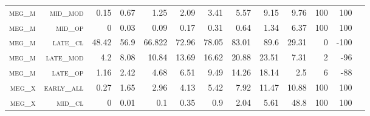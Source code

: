 \begin{landscape}
\begin{table}[!htbp]
\begin{tabular}{@{}rrrrrrrrrr|rrr@{}}
\footnotesize \textsc{meg\_m}      & \footnotesize \textsc{mid\_mod  }                & \footnotesize 0.15          & \footnotesize 0.67           & \footnotesize 1.25             & \footnotesize 2.09            & \footnotesize 3.41            & \footnotesize 5.57            & \footnotesize 9.15       & \footnotesize 9.76     & \footnotesize 100    & \footnotesize 100    \\
\footnotesize \textsc{meg\_m}      & \footnotesize \textsc{mid\_op   }                & \footnotesize 0             & \footnotesize 0.03           & \footnotesize 0.09             & \footnotesize 0.17            & \footnotesize 0.31            & \footnotesize 0.64            & \footnotesize 1.34       & \footnotesize 6.37     & \footnotesize 100    & \footnotesize 100    \\
\footnotesize \textsc{meg\_m}      & \footnotesize \textsc{late\_cl  }                & \footnotesize 48.42         & \footnotesize 56.9           & \footnotesize 66.822           & \footnotesize 72.96           & \footnotesize 78.05           & \footnotesize 83.01           & \footnotesize 89.6       & \footnotesize 29.31    & \footnotesize 0      & \footnotesize -100    \\
\footnotesize \textsc{meg\_m}      & \footnotesize \textsc{late\_mod }                & \footnotesize 4.2           & \footnotesize 8.08           & \footnotesize 10.84            & \footnotesize 13.69           & \footnotesize 16.62           & \footnotesize 20.88           & \footnotesize 23.51      & \footnotesize 7.31     & \footnotesize 2      & \footnotesize -96    \\
\footnotesize \textsc{meg\_m}      & \footnotesize \textsc{late\_op  }                & \footnotesize 1.16          & \footnotesize 2.42           & \footnotesize 4.68             & \footnotesize 6.51            & \footnotesize 9.49            & \footnotesize 14.26           & \footnotesize 18.14      & \footnotesize 2.5      & \footnotesize 6      & \footnotesize -88    \\
\footnotesize \textsc{meg\_x}      & \footnotesize \textsc{early\_all}                & \footnotesize 0.27          & \footnotesize 1.65           & \footnotesize 2.96             & \footnotesize 4.13            & \footnotesize 5.42            & \footnotesize 7.92            & \footnotesize 11.47      & \footnotesize 10.88    & \footnotesize 100    & \footnotesize 100    \\
\footnotesize \textsc{meg\_x}      & \footnotesize \textsc{mid\_cl   }                & \footnotesize 0             & \footnotesize 0.01           & \footnotesize 0.1              & \footnotesize 0.35            & \footnotesize 0.9             & \footnotesize 2.04            & \footnotesize 5.61       & \footnotesize 48.8     & \footnotesize 100    & \footnotesize 100    \\

\end{tabular}
\end{table}
\end{landscape}
